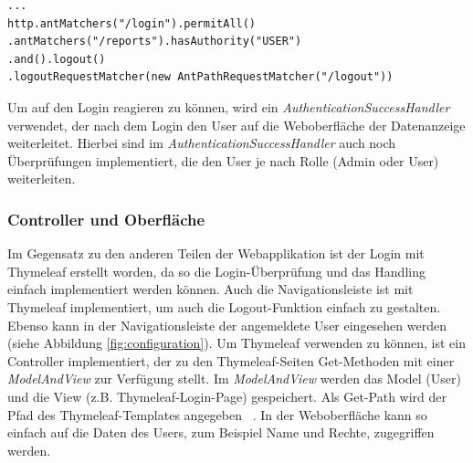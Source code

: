 \begin{samepage}%
	\begin{lstlisting}[float=tbhp]
...
http.antMatchers("/login").permitAll()
.antMatchers("/reports").hasAuthority("USER")
.and().logout()
.logoutRequestMatcher(new AntPathRequestMatcher("/logout"))
\end{lstlisting}
\end{samepage}
Um auf den Login reagieren zu können, wird ein \textit{AuthenticationSuccessHandler} verwendet, der nach dem Login den User auf die Weboberfläche der Datenanzeige weiterleitet. Hierbei sind im \textit{AuthenticationSuccessHandler} auch noch Überprüfungen implementiert, die den User je nach Rolle (Admin oder User) weiterleiten. 
\subsubsection{Controller und Oberfläche} 
Im Gegensatz zu den anderen Teilen der Webapplikation ist der Login mit Thymeleaf erstellt worden, da so die Login-Überprüfung und das Handling einfach implementiert werden können. Auch die Navigationsleiste ist mit Thymeleaf implementiert, um auch die Logout-Funktion einfach zu gestalten. Ebenso kann in der Navigationsleiste der angemeldete User eingesehen werden (siehe Abbildung \ref{fig:configuration}). Um Thymeleaf verwenden zu können, ist ein Controller implementiert, der zu den Thymeleaf-Seiten Get-Methoden mit einer \textit{ModelAndView} zur Verfügung stellt. Im \textit{ModelAndView} werden das Model (User) und die View (z.B. Thymeleaf-Login-Page) gespeichert. Als Get-Path wird der Pfad des Thymeleaf-Templates angegeben ~\parencite[Seite 160]{springSecBook}. In der Weboberfläche kann so einfach auf die Daten des Users, zum Beispiel Name und Rechte, zugegriffen werden.
